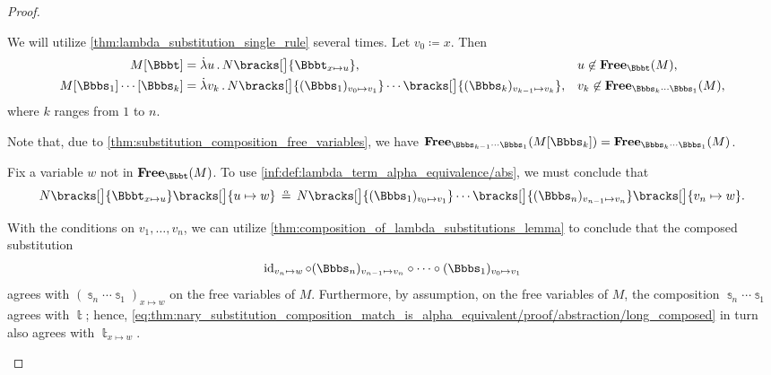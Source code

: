 \begin{proof}
\begin{itemize}
    We will utilize \cref{thm:lambda_substitution_single_rule} several times. Let \( v_0 \coloneqq x \). Then
    \begin{align*}
      M[\Bbbt]                    &= \qabs u N\bracks[\big]{ \Bbbt_{x \mapsto u} },                                                                     &&u \not\in \op*{Free}_\Bbbt(M), \\
      M[\Bbbs_1] \cdots [\Bbbs_k] &= \qabs {v_k} N\bracks[\big]{ (\Bbbs_1)_{v_0 \mapsto v_1} } \cdots \bracks[\big]{ (\Bbbs_k)_{v_{k-1} \mapsto v_k} }, &&v_k \not\in \op*{Free}_{\Bbbs_k \cdots \Bbbs_1}(M),
    \end{align*}
    where \( k \) ranges from \( 1 \) to \( n \).

    Note that, due to \cref{thm:substitution_composition_free_variables}, we have \( \op*{Free}_{\Bbbs_{k-1} \cdots \Bbbs_1}(M[\Bbbs_k]) = \op*{Free}_{\Bbbs_k \cdots \Bbbs_1}(M) \).

    Fix a variable \( w \) not in \( \op*{Free}_\Bbbt(M) \). To use \ref{inf:def:lambda_term_alpha_equivalence/abs}, we must conclude that
    \begin{equation}\label{eq:thm:nary_substitution_composition_match_is_alpha_equivalent/proof/abstraction/goal}
      N\bracks[\big]{ \Bbbt_{x \mapsto u} }\bracks[\big]{ u \mapsto w } \aequiv N\bracks[\big]{ (\Bbbs_1)_{v_0 \mapsto v_1} } \cdots \bracks[\big]{ (\Bbbs_n)_{v_{n-1} \mapsto v_n} } \bracks[\big]{ v_n \mapsto w }.
    \end{equation}

    With the conditions on \( v_1, \ldots, v_n \), we can utilize \cref{thm:composition_of_lambda_substitutions_lemma} to conclude that the composed substitution
    \begin{equation}\label{eq:thm:nary_substitution_composition_match_is_alpha_equivalent/proof/abstraction/long_composed}
      \id_{v_n \mapsto w} \bincirc (\Bbbs_n)_{v_{n-1} \mapsto v_n} \bincirc \cdots \bincirc (\Bbbs_1)_{v_0 \mapsto v_1}
    \end{equation}
    agrees with \( (\Bbbs_n \cdots \Bbbs_1)_{x \mapsto w} \) on the free variables of \( M \). Furthermore, by assumption, on the free variables of \( M \), the composition \( \Bbbs_n \cdots \Bbbs_1 \) agrees with \( \Bbbt \); hence, \eqref{eq:thm:nary_substitution_composition_match_is_alpha_equivalent/proof/abstraction/long_composed} in turn also agrees with \( \Bbbt_{x \mapsto w} \).


\end{itemize}
\end{proof}
